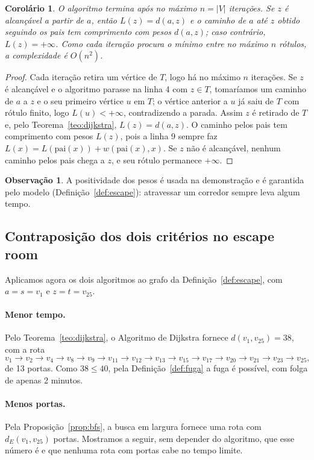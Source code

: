 \documentclass{article}
\theoremstyle{definition}
\newtheorem{observacao}[definicao]{Observação}
\theoremstyle{plain}
\newtheorem{corolario}[definicao]{Corolário}
\newcommand{\dE}{d_E}
\begin{document}
\begin{corolario}\label{cor:dijkstra}
O algoritmo termina após no máximo $n = |V|$ iterações. Se $z$ é alcançável a
partir de $a$, então $L(z) = d(a,z)$ e o caminho de $a$ até $z$ obtido seguindo os
pais tem comprimento com pesos $d(a,z)$; caso contrário, $L(z) = +\infty$. Como
cada iteração procura o mínimo entre no máximo $n$ rótulos, a complexidade é
$O(n^2)$.
\end{corolario}

\begin{proof}
Cada iteração retira um vértice de $T$, logo há no máximo $n$ iterações. Se $z$ é
alcançável e o algoritmo parasse na linha 4 com $z \in T$, tomaríamos um caminho
de $a$ a $z$ e o seu primeiro vértice $u$ em $T$; o vértice anterior a $u$ já
saiu de $T$ com rótulo finito, logo $L(u) < +\infty$, contradizendo a parada.
Assim $z$ é retirado de $T$ e, pelo Teorema~\ref{teo:dijkstra}, $L(z) = d(a,z)$.
O caminho pelos pais tem comprimento com pesos $L(z)$, pois a linha 9 sempre faz
$L(x) = L(\mathrm{pai}(x)) + w(\mathrm{pai}(x), x)$. Se $z$ não é alcançável,
nenhum caminho pelos pais chega a $z$, e seu rótulo permanece $+\infty$.
\end{proof}

\begin{observacao}
A positividade dos pesos é usada na demonstração e é garantida pelo modelo
(Definição~\ref{def:escape}): atravessar um corredor sempre leva algum tempo.
\end{observacao}

\subsection{Contraposição dos dois critérios no escape room}

Aplicamos agora os dois algoritmos ao grafo da Definição~\ref{def:escape}, com
$a = s = v_1$ e $z = t = v_{25}$.

\paragraph{Menor tempo.} Pelo Teorema~\ref{teo:dijkstra}, o Algoritmo de Dijkstra
fornece $d(v_1, v_{25}) = 38$, com a rota
\[
    v_1 \to v_2 \to v_4 \to v_8 \to v_9 \to v_{11} \to v_{12} \to v_{13} \to v_{15}
    \to v_{17} \to v_{20} \to v_{21} \to v_{23} \to v_{25},
\]
de 13 portas. Como $38 \le 40$, pela Definição~\ref{def:fuga} a fuga é possível,
com folga de apenas 2 minutos.

\paragraph{Menos portas.} Pela Proposição~\ref{prop:bfs}, a busca em largura
fornece uma rota com $\dE(v_1, v_{25})$ portas. Mostramos a seguir, sem depender
do algoritmo, que esse número é \kmin{} e que nenhuma rota com \kmin{} portas
cabe no tempo limite.
\end{document}

